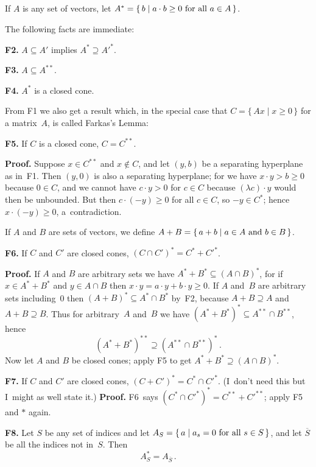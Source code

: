 \meno
If $A$ is any set of vectors, let $A^{\ast}=\{\,b\mid a\cdot b\geq
0\hbox{ for all $a\in A$}\,\}$. 

The following facts are immediate:

\meno
{\bf F2.}\quad
$A\subseteq A'$ implies $A^{\ast}\supseteq A'^{\ast}$.

\meno
{\bf F3.}\quad
$A\subseteq A^{\ast\ast}$.

\meno
{\bf F4.}\quad
$A^{\ast}$ is a closed cone.

\medskip
From F1 we also get a result which, in the special case that $C=\{\,Ax\mid
x\ge0\,\}$ for a matrix~$A$, is called Farkas's Lemma:

\meno
{\bf F5.}\quad
If $C$ is a closed cone, $C=C^{\ast\ast}$.

\meno
{\bf Proof.}\quad
Suppose $x\in C^{\ast\ast}$ and $x\notin C$, and let $(y,b)$ be a
separating hyperplane as in~F1. Then $(y,0)$ is also a
separating hyperplane; for we have $x\cdot y>b\geq 0$ because $0\in
C$, and we cannot have $c\cdot y>0$ for $c\in C$ because $(\lambda
c)\cdot y$ would then be unbounded. But then $c\cdot(-y)\geq 0$ for
all $c\in C$, so $-y\in C^{\ast}$; hence $x\cdot(-y)\geq 0$,
a~contradiction. \ \pfbox

\medskip
If $A$ and $B$ are sets of vectors, we define
 $A+B=\{\,a+b\mid a\in A\ {\rm and}\ b\in B\,\}$.

\meno
{\bf F6.}\quad
If $C$ and $C'$ are closed cones, $(C\cap
C')^{\ast}=C^{\ast}+C'^{\ast}$.

\meno
{\bf Proof.}\quad
If $A$ and $B$ are arbitrary sets we have $A^{\ast}+B^{\ast}\subseteq
(A\cap B)^{\ast}$, for if $x\in A^{\ast}+B^{\ast}$ and $y\in A\cap B$
then $x\cdot y=a\cdot y+b\cdot y\geq 0$. If $A$ and~$B$ are arbitrary
sets including~0 then $(A+B)^{\ast}\subseteq A^{\ast}\cap B^{\ast}$ 
by~F2, because $A+B\supseteq A$ and $A+B\supseteq B$. Thus for
arbitrary~$A$ and~$B$ we have $(A^{\ast}+B^{\ast})^{\ast}\subseteq
A^{\ast\ast}\cap B^{\ast\ast}$, hence
$$(A^{\ast}+B^{\ast})^{\ast\ast}\supseteq (A^{\ast\ast}\cap
B^{\ast\ast})^{\ast}\,.$$ 
Now let $A$ and $B$ be closed cones; apply F5 to get
$A^{\ast}+B^{\ast}\supseteq(A\cap B)^{\ast}$.\ \pfbox

\meno
{\bf F7.}\quad
If $C$ and $C'$ are closed cones, $(C+C')^{\ast}=C^{\ast}\cap
C'^{\ast}$. (I~don't need this but I~might as well state it.) 
{\bf Proof.} F6~says $(C^{\ast}\cap
C'^{\ast})^{\ast}=C^{\ast\ast}+C'^{\ast\ast}$; apply F5 and $\ast$
again. \ \pfbox

\meno
{\bf F8.}\quad
Let $S$ be any set of indices and let $A_S=\{\,a\mid a_s=0\hbox{ for
all }s\in S\,\}$, and let $\overline{S}$ be all the indices not in~$S$.
 Then
$$A_S^{\ast}=A_{\overline{S}}\,.$$

